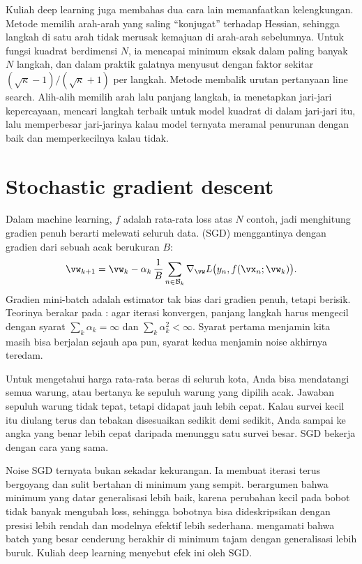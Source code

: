 Kuliah deep learning juga membahas dua cara lain memanfaatkan kelengkungan. Metode  memilih
arah-arah yang saling ``konjugat'' terhadap Hessian, sehingga langkah di satu arah tidak merusak kemajuan di arah-arah
sebelumnya. Untuk fungsi kuadrat berdimensi $N$, ia mencapai minimum eksak dalam paling banyak $N$ langkah, dan dalam
praktik galatnya menyusut dengan faktor sekitar $(\sqrt\kappa-1)/(\sqrt\kappa+1)$ per langkah. Metode 
membalik urutan pertanyaan line search. Alih-alih memilih arah lalu panjang langkah, ia menetapkan jari-jari kepercayaan,
mencari langkah terbaik untuk model kuadrat di dalam jari-jari itu, lalu memperbesar jari-jarinya kalau model ternyata
meramal penurunan dengan baik dan memperkecilnya kalau tidak.

\section{Stochastic gradient descent}

Dalam machine learning, $f$ adalah rata-rata loss atas $N$ contoh, jadi menghitung gradien penuh
berarti melewati seluruh data.  (SGD) menggantinya dengan
gradien dari sebuah  acak berukuran $B$:
\begin{equation}
\vw_{k+1}=\vw_k-\alpha_k\,\frac1B\sum_{n\in\mathcal B_k}\nabla_{\vw}L\big(y_n,f(\vx_n;\vw_k)\big).
\end{equation}
Gradien mini-batch adalah estimator tak bias dari gradien penuh, tetapi berisik. Teorinya
berakar pada  \citep{robbins1951}: agar iterasi konvergen,
panjang langkah harus mengecil dengan syarat $\sum_k\alpha_k=\infty$ dan
$\sum_k\alpha_k^2<\infty$. Syarat pertama menjamin kita masih bisa berjalan sejauh apa pun,
syarat kedua menjamin noise akhirnya teredam.

Untuk mengetahui harga rata-rata beras di seluruh kota, Anda bisa mendatangi semua warung, atau
bertanya ke sepuluh warung yang dipilih acak. Jawaban sepuluh warung tidak tepat, tetapi didapat
jauh lebih cepat. Kalau survei kecil itu diulang terus dan tebakan disesuaikan sedikit demi
sedikit, Anda sampai ke angka yang benar lebih cepat daripada menunggu satu survei besar. SGD
bekerja dengan cara yang sama.

Noise SGD ternyata bukan sekadar kekurangan. Ia membuat iterasi terus bergoyang dan sulit
bertahan di minimum yang sempit. \citet{hochreiter1997flat} berargumen bahwa minimum yang datar
generalisasi lebih baik, karena perubahan kecil pada bobot tidak banyak mengubah loss, sehingga
bobotnya bisa dideskripsikan dengan presisi lebih rendah dan modelnya efektif lebih sederhana.
\citet{keskar2017} mengamati bahwa batch yang besar cenderung berakhir di minimum tajam
dengan generalisasi lebih buruk. Kuliah deep learning menyebut efek ini 
oleh SGD.

